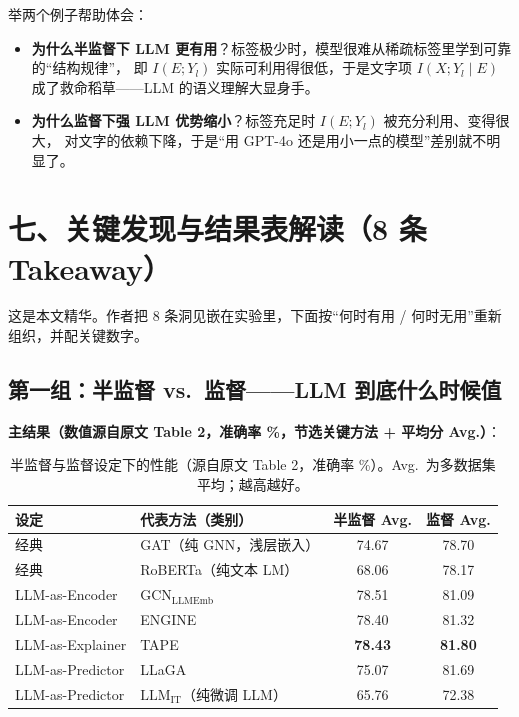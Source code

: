 \documentclass[11pt,UTF8,fontset=fandol]{ctexart}
\begin{document}
举两个例子帮助体会：
\begin{itemize}[leftmargin=2em]
  \item \textbf{为什么半监督下 LLM 更有用}？标签极少时，模型很难从稀疏标签里学到可靠的“结构规律”，
        即 $I(E;Y_l)$ 实际可利用得很低，于是文字项 $I(X;Y_l\mid E)$ 成了救命稻草——LLM 的语义理解大显身手。
  \item \textbf{为什么监督下强 LLM 优势缩小}？标签充足时 $I(E;Y_l)$ 被充分利用、变得很大，
        对文字的依赖下降，于是“用 GPT-4o 还是用小一点的模型”差别就不明显了。
\end{itemize}

\section{七、关键发现与结果表解读（8 条 Takeaway）}

这是本文精华。作者把 8 条洞见嵌在实验里，下面按“何时有用 / 何时无用”重新组织，并配关键数字。

\subsection{第一组：半监督 vs.\ 监督——LLM 到底什么时候值}

\textbf{主结果（数值源自原文 Table 2，准确率 \%，节选关键方法 + 平均分 Avg.）}：

\begin{table}[H]\centering
\caption{半监督与监督设定下的性能（源自原文 Table 2，准确率 \%）。Avg.\ 为多数据集平均；越高越好。}
\begin{tabular}{llcc}
\toprule
设定 & 代表方法（类别） & 半监督 Avg. & 监督 Avg. \\
\midrule
经典 & GAT（纯 GNN，浅层嵌入） & 74.67 & 78.70 \\
经典 & RoBERTa（纯文本 LM） & 68.06 & 78.17 \\
\midrule
LLM-as-Encoder & GCN$_{\mathrm{LLMEmb}}$ & 78.51 & 81.09 \\
LLM-as-Encoder & ENGINE & 78.40 & 81.32 \\
LLM-as-Explainer & TAPE & \textbf{78.43} & \textbf{81.80} \\
LLM-as-Predictor & LLaGA & 75.07 & 81.69 \\
LLM-as-Predictor & $\mathrm{LLM_{IT}}$（纯微调 LLM） & 65.76 & 72.38 \\
\bottomrule
\end{tabular}
\end{table}
\end{document}
